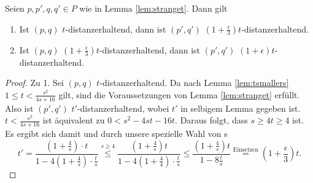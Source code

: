     \begin{lemma}
    	\label{lem:tepsilon}
    	Seien $p, p', q, q' \in P$ wie in Lemma \ref{lem:stranget}. Dann gilt
    	\begin{enumerate}
    		\item Ist $(p, q)$ $t$-distanzerhaltend, dann ist $(p', q')$ $(1 + \frac{\epsilon}{3})t$-distanzerhaltend.
    		\item Ist $(p, q)$ $(1 + \frac{\epsilon}{3})t$-distanzerhaltend, dann ist $(p', q')$ $(1 + \epsilon)t$-distanzerhaltend.
    	\end{enumerate}
    \end{lemma}
    \begin{proof}
    	Zu 1. Sei $(p, q)$ $t$-distanzerhaltend. Da nach Lemma \ref{lem:tsmallers} $1 \leq t < \frac{s^2}{4s + 16}$ gilt, sind die Voraussetzungen von Lemma \ref{lem:stranget} erfüllt.
    	Also ist $(p', q')$ $t'$-distanzerhaltend, wobei $t'$ in selbigem Lemma gegeben ist. 
    	$t < \frac{s^2}{4s + 16}$ ist äquivalent zu $0 < s^2 - 4st - 16t$. 
    	Daraus folgt, dass $s \geq 4t \geq 4$ ist. Es ergibt sich damit und durch unsere spezielle Wahl von s 
    	\[
    	t' = \frac{(1+\frac{4}{s})\cdot t}{1 - 4(1 + \frac{4}{s})\cdot\frac{t}{s}}
    	\stackrel{s \geq 4}{\leq} \frac{(1 + \frac{4}{s})t}{1 - 4(1 + \frac{4}{4})\cdot \frac{t}{s}}
    	\leq \frac{(1 + \frac{4}{s})t}{1 - 8 \frac{t}{s}} 
    	\stackrel{\text{Einsetzen}}{=} (1+ \frac{\epsilon}{3})t.
    	\]
    	

\end{proof}
